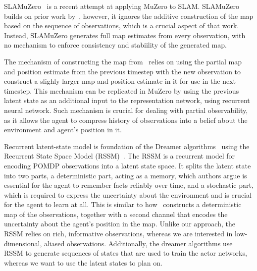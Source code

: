 \documentclass[12pt]{article}
\begin{document}
SLAMuZero~\cite{fangSLAMuZeroPlanLearn2024} is a recent attempt at applying MuZero to SLAM. 
SLAMuZero builds on prior work by~\textcite{chaplotLearningExploreUsing2020}, however, it ignores the additive construction of the map based on the sequence of observations, which is a crucial aspect of that work. 
Instead, SLAMuZero generates full map estimates from every observation, with no mechanism to enforce consistency and stabiility of the generated map. 

The mechanism of constructing the map from~\textcite{chaplotLearningExploreUsing2020} relies on using the partial map and position estimate from the previous timestep with the new observation to construct a slighly larger map and position estimate in it for use in the next timestep. 
This mechanism can be replicated in MuZero by using the previous latent state as an additional input to the representation network, using recurrent neural network.
Such mechanism is crucial for dealing with partial observability, as it allows the agent to compress history of observations into a belief about the environment and agent's position in it. 

Recurrent latent-state model is foundation of the Dreamer algorithms~\cite{hafnerMasteringDiverseDomains2024} using the Recurrent State Space Model (RSSM)~\cite{hafnerLearningLatentDynamics2019}. The RSSM is a recurrent model for encoding POMDP observations into a latent state space. It splits the latent state into two parts, a deterministic part, acting as a memory, which authors argue is essential for the agent to remember facts reliably over time, and a stochastic part, which is required to express the uncertainty about the environment and is crucial for the agent to learn at all. This is similar to how~\textcite{chaplotLearningExploreUsing2020} constructs a deterministic map of the observations, together with a second channel that encodes the uncertainty about the agent's position in the map.
Unlike our approach, the RSSM relies on rich, informative observations, whereas we are interested in low-dimensional, aliased observations. Additionally, the dreamer algorithms use RSSM to generate sequences of states that are used to train the actor networks, whereas we want to use the latent states to plan on.

\end{document}
